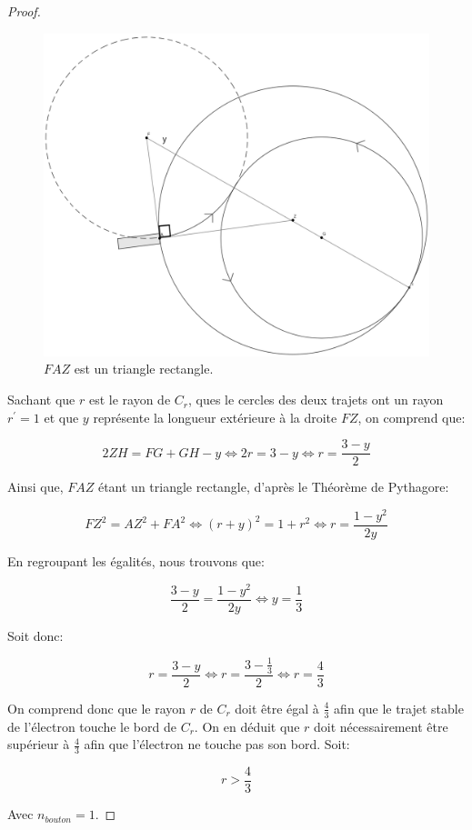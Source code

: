 \documentclass[a4paper]{amsart}
\theoremstyle{definition}
\theoremstyle{remark}
\numberwithin{equation}{section}
\begin{document}
\begin{proof}
  \begin{figure}[H]
    \centering
    \includegraphics[scale=0.15]{images/q2_representation.png}
    \caption{$FAZ$ est un triangle rectangle.}
  \end{figure}

  Sachant que $r$ est le rayon de $C_r$, ques le cercles des deux trajets ont un rayon $r^\prime=1$ et que $y$ représente la longueur extérieure à la droite $FZ$, on comprend que:

  \[2ZH=FG+GH-y \Leftrightarrow 2r=3-y \Leftrightarrow r=\frac{3-y}{2}\]

  Ainsi que, $FAZ$ étant un triangle rectangle, d'après le Théorème de Pythagore:

  \[FZ^2=AZ^2+FA^2 \Leftrightarrow (r+y)^2=1+r^2 \Leftrightarrow r=\frac{1-y^2}{2y}\]

  En regroupant les égalités, nous trouvons que:

  \[\frac{3-y}{2}=\frac{1-y^2}{2y}\Leftrightarrow y=\frac{1}{3}\]

  Soit donc:

  \[ r=\frac{3-y}{2}\Leftrightarrow r=\frac{3-\frac{1}{3}}{2} \Leftrightarrow r=\frac{4}{3}\]

  On comprend donc que le rayon $r$ de $C_r$ doit être égal à $\frac{4}{3}$ afin que le trajet stable de l'électron touche le bord de $C_r$. On en déduit que $r$ doit nécessairement être supérieur à $\frac{4}{3}$ afin que l'électron ne touche pas son bord.
  Soit:

  \[r>\frac{4}{3}\]

  Avec $n_{bouton}=1$.
\end{proof}
\end{document}
